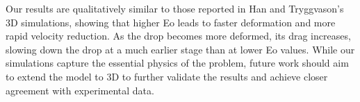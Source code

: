 \documentclass[12pt]{article}
\begin{document}
Our results are qualitatively similar to those reported in Han and Tryggvason’s 3D simulations, showing that higher Eo leads to faster deformation and more rapid velocity reduction. As the drop becomes more deformed, its drag increases, slowing down the drop at a much earlier stage than at lower Eo values. While our simulations capture the essential physics of the problem, future work should aim to extend the model to 3D to further validate the results and achieve closer agreement with experimental data.





\end{document}
